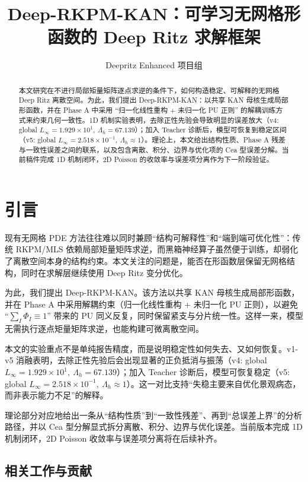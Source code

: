 ﻿\documentclass[lang=cn,a4paper]{elegantpaper}
\title{Deep-RKPM-KAN：可学习无网格形函数的 Deep Ritz 求解框架}
\author{Deepritz Enhanced 项目组}
\institute{Deepritz Enhanced}
\date{\zhdate{2026/03/03}}
\begin{document}
\maketitle

\begin{abstract}
本文研究在不进行局部矩量矩阵逐点求逆的条件下，如何构造稳定、可解释的无网格 Deep Ritz 离散空间。为此，我们提出 Deep-RKPM-KAN：以共享 KAN 母核生成局部形函数，并在 Phase A 中采用 ``归一化线性重构 + 未归一化 PU 正则'' 的解耦训练方式来约束几何一致性。1D 机制实验表明，去除正性先验会导致明显的误差放大（v4: global $L_\infty=1.929\times10^1,\ \Lambda_h=67.139$）；加入 Teacher 诊断后，模型可恢复到稳定区间（v5: global $L_\infty=2.518\times10^{-1},\ \Lambda_h\approx1$）。理论上，本文给出结构性质、Phase A 残差与一致性误差之间的联系，以及包含离散、积分、边界与优化项的 Cea 型误差分解。当前稿件完成 1D 机制闭环，2D Poisson 的收敛率与误差项分离作为下一阶段验证。
\end{abstract}

\section{引言}
现有无网格 PDE 方法往往难以同时兼顾“结构可解释性”和“端到端可优化性”：传统 RKPM/MLS 依赖局部矩量矩阵求逆，而黑箱神经算子虽然便于训练，却弱化了离散空间本身的结构约束。本文关注的问题是，能否在形函数层保留无网格结构，同时在求解层继续使用 Deep Ritz 变分优化。

为此，我们提出 Deep-RKPM-KAN。该方法以共享 KAN 母核生成局部形函数，并在 Phase A 中采用解耦约束（归一化线性重构 + 未归一化 PU 正则），以避免 ``$\sum_I\Phi_I\equiv1$'' 带来的 PU 同义反复，同时保留紧支与分片统一性。这样一来，模型无需执行逐点矩量矩阵求逆，也能构建可微离散空间。

本文的实验重点不是单纯报告精度，而是说明稳定性如何失去、又如何恢复。v1-v5 消融表明，去除正性先验后会出现显著的正负抵消与振荡（v4: global $L_\infty=1.929\times10^1,\ \Lambda_h=67.139$）；加入 Teacher 诊断后，模型可恢复稳定（v5: global $L_\infty=2.518\times10^{-1},\ \Lambda_h\approx1$）。这一对比支持“失稳主要来自优化景观病态，而非表示能力不足”的解释。

理论部分对应地给出一条从“结构性质”到“一致性残差”、再到“总误差上界”的分析路径，并以 Cea 型分解显式拆分离散、积分、边界与优化误差。当前版本完成 1D 机制闭环，2D Poisson 收敛率与误差项分离将在后续补齐。
\subsection{相关工作与贡献}
\end{document}
